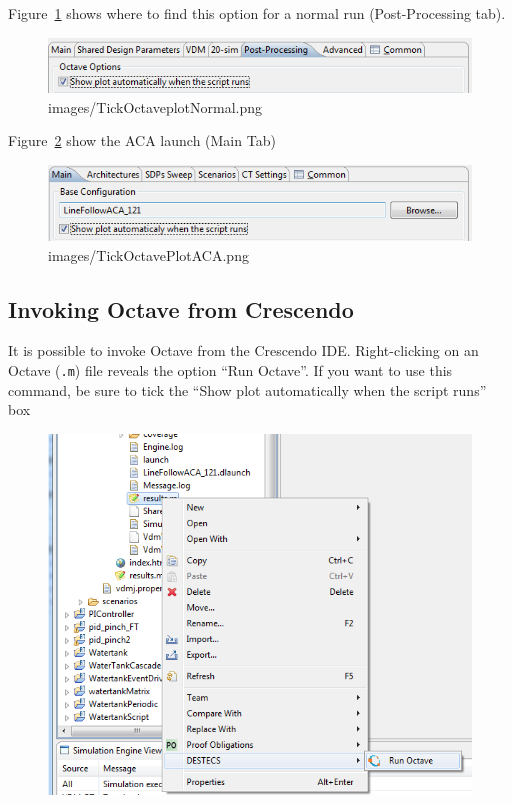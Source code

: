 \documentclass{crescendorepchap}
\begin{document}
Figure~\ref{fig:octaveplotnormal} shows where to find this option for a normal run
(Post-Processing tab).

\begin{figure}[htbp]
\centering
\includegraphics[width=.6\textwidth]{images/TickOctaveplotNormal.png}
\caption{images/TickOctaveplotNormal.png}
\label{fig:octaveplotnormal}
\end{figure}

Figure~\ref{fig:octaveplotaca} show the ACA launch (Main Tab)

\begin{figure}[htbp]
\centering
\includegraphics[width=.6\textwidth]{images/TickOctavePlotACA.png}
\caption{images/TickOctavePlotACA.png}
\label{fig:octaveplotaca}
\end{figure}

\subsection{Invoking Octave from Crescendo}

It is possible to invoke Octave from the Crescendo IDE. Right-clicking on
an Octave (\texttt{.m}) file reveals the option ``Run Octave''. If you want to
use this command, be sure to tick the ``Show plot automatically when the
script runs'' box

\begin{figure}[htbp]
\centering
\includegraphics[width=.6\textwidth]{images/OctaveAction.png}
\caption{}
\end{figure}
\end{document}
